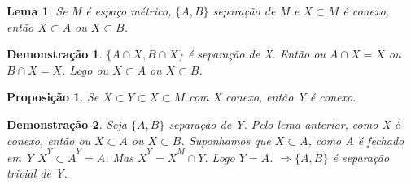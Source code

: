 \documentclass{article}
\newtheorem*{proposicao}{Proposição}
\newtheorem*{lema}{Lema}
\newtheorem*{prova}{Demonstração}
\begin{document}
\begin{lema}
    Se M é espaço métrico, $\{A, B\}$ separação de M e $X \subset M$ é conexo, então $X \subset A$ ou $X \subset B$. 
\end{lema}

\begin{prova}
    $\{A \cap X, B \cap X\}$ é separação de X. Então ou $A \cap X = X$ ou $B \cap X = X$. Logo ou $X \subset A$ ou $X \subset B$.
\end{prova}

\begin{proposicao}
    Se $X \subset Y \subset \overline{X} \subset M$ com X conexo, então Y é conexo.
\end{proposicao}

\begin{prova}
    Seja $\{A, B\}$ separação de Y. Pelo lema anterior, como X é conexo, então ou $X \subset A$ ou $X \subset B$.
    Suponhamos que $X \subset A$, como A é fechado em Y $\overline{X}^Y \subset \overline{A}^Y = A$.
    Mas $\overline{X}^Y = \overline{X}^M \cap Y$. Logo $Y = A$.
    $\Rightarrow \{A, B\}$ é separação trivial de Y.
\end{prova}
\end{document}
